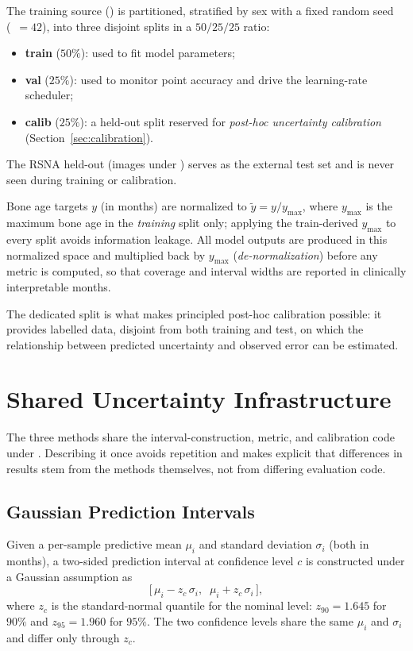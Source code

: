 The training source () is partitioned, stratified by sex with a
fixed random seed (~$=42$), into three disjoint splits in a
$50/25/25$ ratio:
\begin{itemize}
  \item \textbf{train} ($50\%$): used to fit model parameters;
  \item \textbf{val} ($25\%$): used to monitor point accuracy and drive the
  learning-rate scheduler;
  \item \textbf{calib} ($25\%$): a held-out split reserved for \emph{post-hoc
  uncertainty calibration} (Section~\ref{sec:calibration}).
\end{itemize}
The RSNA held-out  (images under ) serves as the
external test set and is never seen during training or calibration.

Bone age targets $y$ (in months) are normalized to $\tilde{y} = y / y_{\max}$,
where $y_{\max}$ is the maximum bone age in the \emph{training} split only;
applying the train-derived $y_{\max}$ to every split avoids information leakage.
All model outputs are produced in this normalized space and multiplied back by
$y_{\max}$ (\emph{de-normalization}) before any metric is computed, so that
coverage and interval widths are reported in clinically interpretable months.

The dedicated  split is what makes principled post-hoc calibration
possible: it provides labelled data, disjoint from both training and test, on
which the relationship between predicted uncertainty and observed error can be
estimated.

\section{Shared Uncertainty Infrastructure}
\label{sec:infra}

The three methods share the interval-construction, metric, and calibration code
under . Describing it once avoids repetition and makes explicit
that differences in results stem from the methods themselves, not from
differing evaluation code.

\subsection{Gaussian Prediction Intervals}

Given a per-sample predictive mean $\mu_i$ and standard deviation $\sigma_i$ (both
in months), a two-sided prediction interval at confidence level $c$ is
constructed under a Gaussian assumption as
\begin{equation}
  \big[\,\mu_i - z_c\,\sigma_i,\;\; \mu_i + z_c\,\sigma_i\,\big],
  \label{eq:interval}
\end{equation}
where $z_c$ is the standard-normal quantile for the nominal level: $z_{90}=1.645$
for $90\%$ and $z_{95}=1.960$ for $95\%$. The two confidence levels share the
same $\mu_i$ and $\sigma_i$ and differ only through $z_c$.

